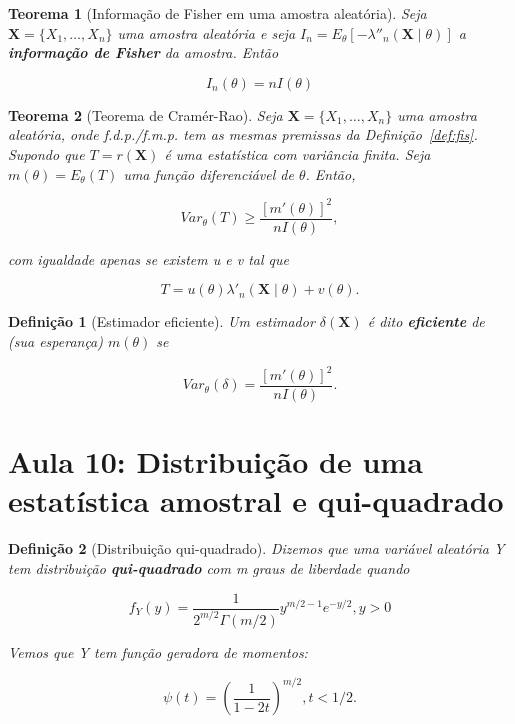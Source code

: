 \documentclass{article}
\newtheorem{theorem}{Teorema}
\newtheorem{definition}{Definição}
\begin{document}
\begin{theorem}[Informação de Fisher em uma amostra aleatória]
Seja $\textbf{X} = \{ X_1, \ldots, X_n \}$ uma amostra aleatória e seja $I_n = E_\theta [- \lambda''_n (\textbf{X} \mid \theta)]$ a \textbf{informação de Fisher} da amostra. Então

$$I_n(\theta) = n I(\theta)$$
\end{theorem}

\begin{theorem}[Teorema de Cramér-Rao]
Seja $\textbf{X} = \{ X_1, \ldots, X_n \}$ uma amostra aleatória, onde f.d.p./f.m.p. tem as mesmas premissas da Definição~\ref{def:fis}. Supondo que $T = r(\textbf{X})$ é uma estatística com variância finita. Seja $m(\theta) = E_\theta(T)$ uma função diferenciável de $\theta$. Então,

\begin{equation}
    Var_\theta(T) \geq \frac{[m'(\theta)]^2}{n I(\theta)},
\end{equation}

com igualdade apenas se existem u e v tal que

$$T = u(\theta) \lambda'_n (\textbf{X} \mid \theta) + v(\theta).$$
\end{theorem}

\begin{definition}[Estimador eficiente]
Um estimador $\delta(\textbf{X})$ é dito \textbf{eficiente} de (sua esperança) $m(\theta)$ se

$$Var_\theta(\delta) = \frac{[m'(\theta)]^2}{n I(\theta)}.$$
\end{definition}

\section*{Aula 10: Distribuição de uma estatística amostral e qui-quadrado}

\begin{definition}[Distribuição qui-quadrado]
Dizemos que uma variável aleatória Y tem distribuição \textbf{qui-quadrado} com m graus de liberdade quando

\begin{equation}
    f_Y(y) = \frac{1}{2^{m/2} \Gamma(m/2)} y^{m/2 - 1} e^{-y/2}, y > 0
\end{equation}

Vemos que Y tem função geradora de momentos:

$$\psi (t) = \left ( \frac{1}{1 - 2t} \right )^{m/2}, t < 1/2.$$
\end{definition}
\end{document}
